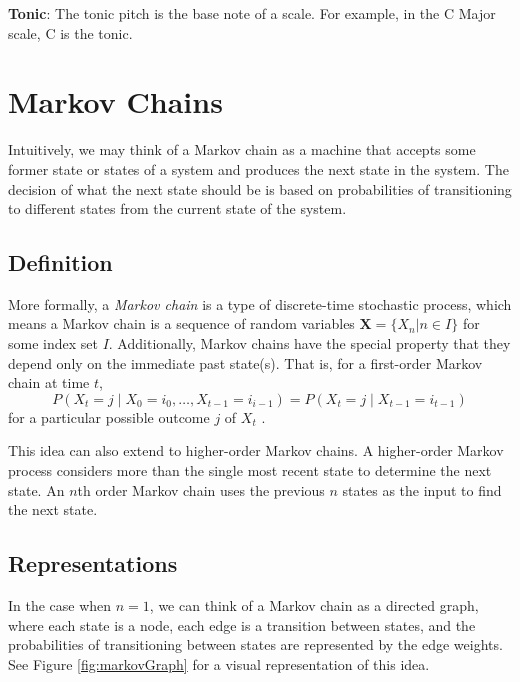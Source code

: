 \textbf{Tonic}: The tonic pitch is the base note of a scale.
For example, in the C Major scale, C is the tonic.

\section[Markov Chains]{Markov Chains} \label{bg:markov}

Intuitively, we may think of a Markov chain as a machine that accepts some former state or states of a system and produces the next state in the system.
The decision of what the next state should be is based on probabilities of transitioning to different states from the current state of the system.

\subsection{Definition} \label{bg:markov:definitions}

More formally, a \textit{Markov chain} is a type of discrete-time stochastic process, which means a Markov chain is a sequence of random variables $\boldsymbol{X} = \{X_{n} | n \in I\}$ for some index set $I$.
Additionally, Markov chains have the special property that they depend only on the immediate past state(s).
That is, for a first-order Markov chain at time $t$, $$P(X_{t} = j \mid X_{0} = i_{0}, \ldots, X_{t - 1} = i_{i - 1}) = P(X_{t} = j \mid X_{t - 1} = i_{t - 1})$$ for a particular possible outcome $j$ of $X_{t}$ \cite{nierhaus_algorithmic_2009}.

This idea can also extend to higher-order Markov chains.
A higher-order Markov process considers more than the single most recent state to determine the next state.
An $n$th order Markov chain uses the previous $n$ states as the input to find the next state.

\subsection{Representations} \label{bg:markov:representations}

In the case when $n = 1$, we can think of a Markov chain as a directed graph, where each state is a node, each edge is a transition between states, and the probabilities of transitioning between states are represented by the edge weights.
See Figure \ref{fig:markovGraph} for a visual representation of this idea.

